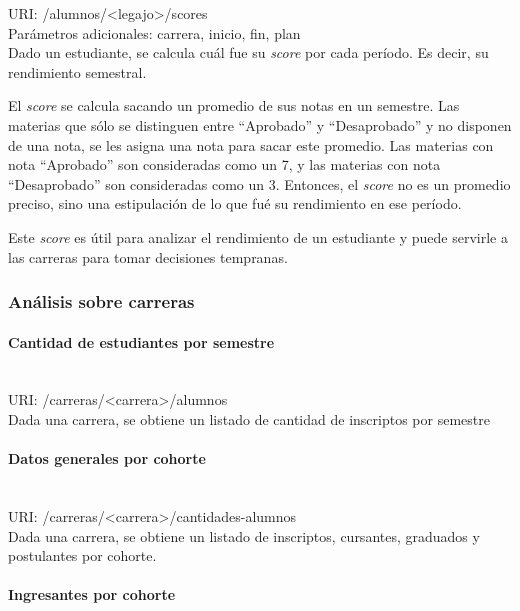 URI: /alumnos/<legajo>/scores \\

Parámetros adicionales: carrera, inicio, fin, plan \\

Dado un estudiante, se calcula cuál fue su \textit{score} por cada período. Es decir, su rendimiento semestral. 

El \textit{score} se calcula sacando un promedio de sus notas en un semestre. Las materias que sólo se distinguen entre “Aprobado” y “Desaprobado” y no disponen de una nota, se les asigna una nota para sacar este promedio.
Las materias con nota “Aprobado” son consideradas como un 7, y las materias con nota “Desaprobado” son consideradas como un 3. Entonces, el \textit{score} no es un promedio preciso, sino una estipulación de lo que fué su rendimiento en ese período.

Este \textit{score} es útil para analizar el rendimiento de un estudiante y puede servirle a las carreras para tomar decisiones tempranas.

\subsubsection{Análisis sobre carreras}

\paragraph{Cantidad de estudiantes por semestre}\mbox{}\\

URI: /carreras/<carrera>/alumnos \\

Dada una carrera, se obtiene un listado de cantidad de inscriptos por semestre


\paragraph{Datos generales por cohorte}\mbox{}\\

URI: /carreras/<carrera>/cantidades-alumnos \\

Dada una carrera, se obtiene un listado de inscriptos, cursantes, graduados y postulantes por cohorte.


\paragraph{Ingresantes por cohorte}\mbox{}\\

